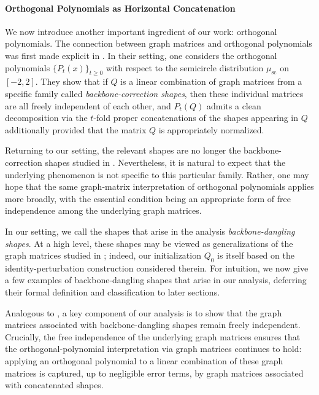 \documentclass[12pt]{article}
\begin{document}
\paragraph{Orthogonal Polynomials as Horizontal Concatenation}
We now introduce another important ingredient of our work: orthogonal polynomials.
The connection between graph matrices and orthogonal polynomials was first made
explicit in \cite{PotechinXu2026Theta}. In their setting, one considers the
orthogonal polynomials \(\{P_t(x)\}_{t\ge 0}\) with respect to the semicircle
distribution \(\mu_{\mathrm{sc}}\) on \([-2,2]\). They show that if \(Q\) is a
linear combination of graph matrices from a specific family called \emph{backbone-correction shapes}, then these individual matrices are all freely independent of each other, and \(P_t(Q)\) admits a clean decomposition via the \(t\)-fold proper concatenations of the shapes appearing in \(Q\) additionally provided that the matrix $Q$ is appropriately normalized.

Returning to our setting, the relevant shapes are no longer the
backbone-correction shapes studied in \cite{PotechinXu2026Theta}. Nevertheless,
it is natural to expect that the underlying phenomenon is not specific to this
particular family. Rather, one may hope that the same graph-matrix
interpretation of orthogonal polynomials applies more broadly, with the
essential condition being an appropriate form of free independence among the
underlying graph matrices.

In our setting, we call the shapes that arise in the analysis
\emph{backbone-dangling shapes}. At a high level, these shapes may be viewed as
generalizations of the graph matrices studied in \cite{HKPX23}; indeed, our
initialization \(Q_0\) is itself based on the identity-perturbation construction
considered therein. For intuition, we now give a few examples of backbone-dangling shapes that arise
in our analysis, deferring their formal definition and classification to later
sections.

 Analogous to \cite{PotechinXu2026Theta}, a key component of our
analysis is to show that the graph matrices associated with backbone-dangling
shapes remain freely independent. Crucially, the free independence of the underlying graph matrices ensures that the orthogonal-polynomial interpretation
via graph matrices continues to hold: applying an orthogonal
polynomial to a linear combination of these graph matrices is captured, up to negligible error terms, by graph matrices associated with concatenated shapes.
\end{document}
